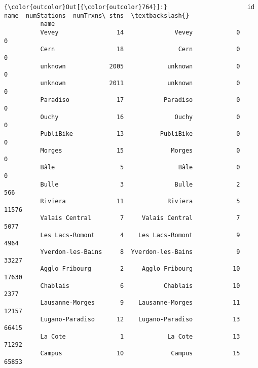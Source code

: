 \documentclass{report}
\begin{document}
            \begin{Verbatim}[commandchars=\\\{\}]
{\color{outcolor}Out[{\color{outcolor}764}]:}                      id               name  numStations  numTrxns\_stns  \textbackslash{}
          name                                                                     
          Vevey                14              Vevey            0              0   
          Cern                 18               Cern            0              0   
          unknown            2005            unknown            0              0   
          unknown            2011            unknown            0              0   
          Paradiso             17           Paradiso            0              0   
          Ouchy                16              Ouchy            0              0   
          PubliBike            13          PubliBike            0              0   
          Morges               15             Morges            0              0   
          Bâle                  5               Bâle            0              0   
          Bulle                 3              Bulle            2            566   
          Riviera              11            Riviera            5          11576   
          Valais Central        7     Valais Central            7           5077   
          Les Lacs-Romont       4    Les Lacs-Romont            9           4964   
          Yverdon-les-Bains     8  Yverdon-les-Bains            9          33227   
          Agglo Fribourg        2     Agglo Fribourg           10          17630   
          Chablais              6           Chablais           10           2377   
          Lausanne-Morges       9    Lausanne-Morges           11          12157   
          Lugano-Paradiso      12    Lugano-Paradiso           13          66415   
          La Cote               1            La Cote           13          71292   
          Campus               10             Campus           15          65853   
          

\end{Verbatim}
\end{document}
